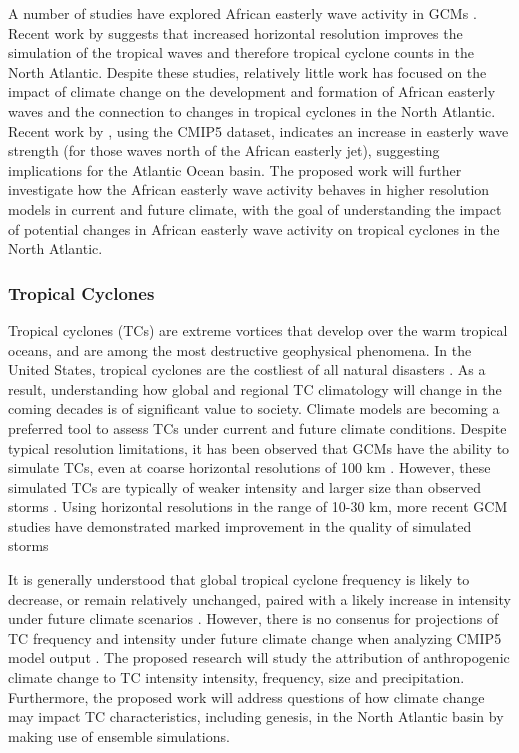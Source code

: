 \documentclass[11pt]{article}
\begin{document}
A number of studies have explored African easterly wave activity in GCMs \citep{Ruit&DellAquila2010,Daloz2012,Skinner&Diffenbaugh2013,McCrary2014}. Recent work by \citet{Roberts2014} suggests that increased horizontal resolution improves the simulation of the tropical waves and therefore tropical cyclone counts in the North Atlantic.  Despite these studies, relatively little work has focused on the impact of climate change on the development and formation of African easterly waves and the connection to changes in tropical cyclones in the North Atlantic. Recent work by \citet{Skinner&Diffenbaugh2013}, using the CMIP5 dataset, indicates an increase in easterly wave strength (for those waves north of the African easterly jet), suggesting implications for the Atlantic Ocean basin. The proposed work will  further investigate how the African easterly wave activity behaves in higher resolution models in current and future climate, with the goal of understanding the impact of potential changes in African easterly wave activity on tropical cyclones in the North Atlantic.

\subsubsection{Tropical Cyclones}
Tropical cyclones (TCs) are extreme vortices that develop over the warm tropical oceans, and are among the most destructive geophysical phenomena. In the United States, tropical cyclones are the costliest of all natural disasters \citep{Pielke1998}. As a result, understanding how global and regional TC climatology will change in the coming decades is of significant value to society. Climate models are becoming a preferred tool to assess TCs under current and future climate conditions. Despite typical resolution limitations, it has been observed that GCMs have the ability to simulate TCs, even at coarse horizontal resolutions of 100 km \citep{Knutson2010}. However, these simulated TCs are typically of weaker intensity and larger size than observed storms \citep{Walsh2007}. Using horizontal resolutions in the range of 10-30 km, more recent GCM studies have demonstrated marked improvement in the quality of simulated storms \citep{Murakami2012,Manganello2012, Bacmeister2014, Wehner2014,Reed2015b}

It is generally understood that global tropical cyclone frequency is likely to decrease, or remain relatively unchanged, paired with a likely increase in intensity under future climate scenarios \citep{IPCCAR5WGI}. However, there is no consenus for projections of TC frequency and intensity under future climate change when analyzing CMIP5 model output \citep{Camargo2013}. The proposed research will study the attribution of anthropogenic climate change to TC intensity intensity, frequency, size and precipitation. Furthermore, the proposed work will address questions of how climate change may impact TC characteristics, including genesis, in the North Atlantic basin by making use of ensemble simulations.  
\end{document}
